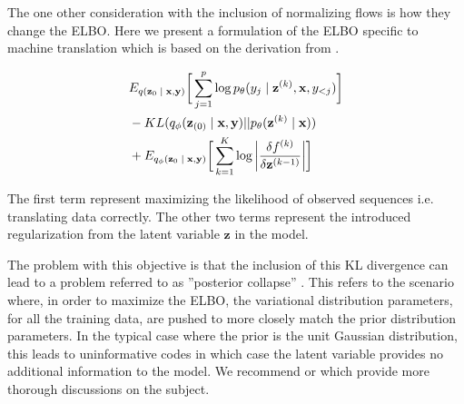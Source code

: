 
The one other consideration with the inclusion of normalizing flows is how they change the ELBO. Here we present a formulation of the ELBO specific to machine translation which is based on the derivation from \citealp[Section 4.2]{rezende2015VIwithNF}.

\begin{align}
	\begin{split}\label{eq:2}
		&
		E_{q(\textbf{z}_{0}\; | \;{\textbf{x}, \textbf{y}})} \bigg[ \sum_{j=1}^{p} \log p_{\theta}(y_{j} \; | \;{\textbf{z}^{(k)}}, \textbf{x}, y_{<j}) \bigg] \\
		& - KL(q_{\phi}(\textbf{z}_{(0)} \; | \;{\textbf{x}, \textbf{y}}) || p_{\theta}(\textbf{z}^{(k)} \; | \;{\textbf{x}})) \\
		&   +  E_{q_{\phi}(\textbf{z}_{0} \; | \;{\textbf{x}, \textbf{y}})} \bigg[\sum_{k=1}^{K} \log \bigg|\frac{\delta f^{(k)}}{\delta \textbf{z}^{(k-1)}} \bigg| \bigg]  
	\end{split}
\end{align}

The first term represent maximizing the likelihood of observed sequences i.e. translating data correctly. The other two terms represent the introduced regularization from the latent variable $\textbf{z}$ in the model. 

The problem with this objective is that the inclusion of this KL divergence can lead to a problem referred to as ''posterior collapse'' \cite{he2018lagging}. This refers to the scenario where, in order to maximize the ELBO, the variational distribution parameters, for all the training data, are pushed to more closely match the prior distribution parameters. In the typical case where the prior is the unit Gaussian distribution, this leads to uninformative codes in which case the latent variable provides no additional information to the model. We recommend \citet{chen2016VariationalLossyAE} or \citet{zhao2017InfoVAE} which provide more thorough discussions on the subject. 


